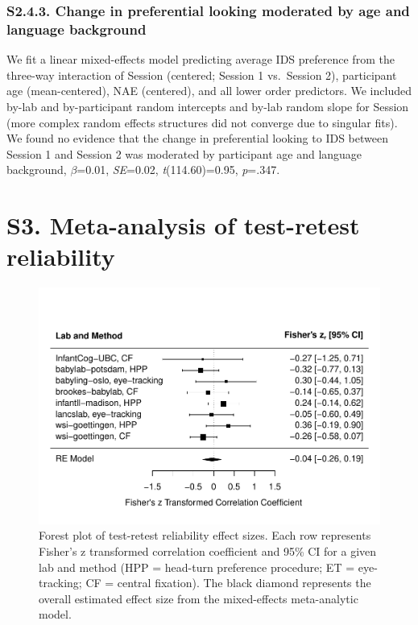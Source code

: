 \documentclass[
  man, donotrepeattitle,floatsintext]{apa6}
\begin{document}
\hypertarget{s2.4.3.-change-in-preferential-looking-moderated-by-age-and-language-background}{%
\subsubsection{S2.4.3. Change in preferential looking moderated by age and language background}\label{s2.4.3.-change-in-preferential-looking-moderated-by-age-and-language-background}}

We fit a linear mixed-effects model predicting average IDS preference from the three-way interaction of Session (centered; Session 1 vs.~Session 2), participant age (mean-centered), NAE (centered), and all lower order predictors.
We included by-lab and by-participant random intercepts and by-lab random slope for Session (more complex random effects structures did not converge due to singular fits).
We found no evidence that the change in preferential looking to IDS between Session 1 and Session 2 was moderated by participant age and language background, \(\beta\)=0.01, \emph{SE}=0.02, \emph{t}(114.60)=0.95, \emph{p}=.347.

\hypertarget{s3.-meta-analysis-of-test-retest-reliability}{%
\section{S3. Meta-analysis of test-retest reliability}\label{s3.-meta-analysis-of-test-retest-reliability}}

\begin{figure}
\centering
\includegraphics{MB1T_supplement_files/figure-latex/unnamed-chunk-16-1.pdf}
\caption{\label{fig:unnamed-chunk-16}Forest plot of test-retest reliability effect sizes. Each row represents Fisher's z transformed correlation coefficient and 95\% CI for a given lab and method (HPP = head-turn preference procedure; ET = eye-tracking; CF = central fixation). The black diamond represents the overall estimated effect size from the mixed-effects meta-analytic model.}
\end{figure}
\end{document}
